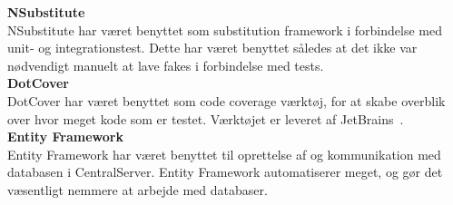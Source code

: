 \textbf{NSubstitute}~\cite{NSubstitute}\\
NSubstitute har været benyttet som substitution framework i forbindelse med unit- og integrationstest. Dette har været benyttet således at det ikke var nødvendigt manuelt at lave fakes i forbindelse med tests.\\

\textbf{DotCover}~\cite{dotCover}\\
DotCover har været benyttet som code coverage værktøj, for at skabe overblik over hvor meget kode som er testet. Værktøjet er leveret af JetBrains~\cite{JetBrains}.\\

\textbf{Entity Framework}~\cite{EF}\\
Entity Framework har været benyttet til oprettelse af og kommunikation med databasen i CentralServer. Entity Framework automatiserer meget, og gør det væsentligt nemmere at arbejde med databaser.



